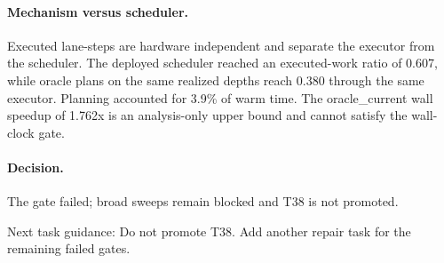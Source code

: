 \paragraph{Mechanism versus scheduler.}
Executed lane-steps are hardware independent and separate the executor from the scheduler. The deployed scheduler reached an executed-work ratio of 0.607, while oracle plans on the same realized depths reach 0.380 through the same executor.
Planning accounted for 3.9\% of warm time.
The oracle\_current wall speedup of 1.762x is an analysis-only upper bound and cannot satisfy the wall-clock gate.

\paragraph{Decision.}
The gate failed; broad sweeps remain blocked and T38 is not promoted.

Next task guidance: Do not promote T38. Add another repair task for the remaining failed gates.
